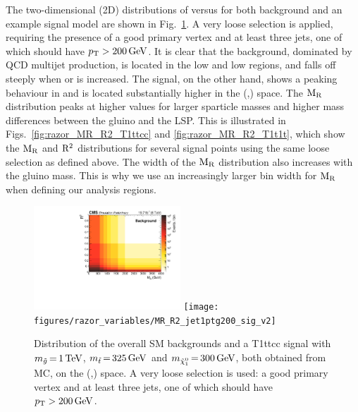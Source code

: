 The two-dimensional (2D) distributions of \rsq versus \mr for both background and an example signal
model are shown in Fig.~\ref{fig:razor_MR_Rsq_bg_signal}. A very loose selection is applied,
requiring the presence of a good primary vertex and at least three jets, one of which should have
$p_{\mathrm{T}} > 200\,\text{Ge\hspace{-.08em}V}$. It is clear that the background, dominated by QCD multijet production, is located
in the low \mr and low \rsq regions, and falls off steeply when \mr or \rsq is increased. The
signal, on the other hand, shows a peaking behaviour in \mr and is located substantially higher in
the (\mr,\rsq) space. 
The $\mathrm{M_R}$ distribution peaks at higher values for larger sparticle masses and higher mass
differences between the gluino and the LSP. This is illustrated
in Figs.~\ref{fig:razor_MR_R2_T1ttcc} and \ref{fig:razor_MR_R2_T1t1t}, which show the $\mathrm{M_R}$ and
$\mathrm{R^2}$ distributions for several signal points using the same loose selection as defined above.
The width of the $\mathrm{M_R}$ distribution also increases with the gluino mass. This is why we use an
increasingly larger bin width for $\mathrm{M_R}$ when defining our analysis regions. 


\begin{figure}[htpb]
\centering
\includegraphics[width=0.49\textwidth]{figures/razor_variables/MR_R2_jet1ptg200_bg_v2} 
\texttt{[image: figures/razor\_variables/MR\_R2\_jet1ptg200\_sig\_v2]}
\caption{Distribution of the overall SM backgrounds and a T1ttcc signal with $m_{\tilde{g}} \,{=}\,
1\,\text{Te\hspace{-.08em}V}$, $m_{\tilde{t}} \,{=}\, 325\,\text{Ge\hspace{-.08em}V}$ and $m_{\tilde{\chi}_1^0} \,{=}\, 300\,\text{Ge\hspace{-.08em}V}$, both obtained
from MC, on the (\mr,\rsq) space. A very loose selection is used:  a good primary vertex and at
least three jets, one of which should have $p_{\mathrm{T}} > 200\,\text{Ge\hspace{-.08em}V}$. 
\label{fig:razor_MR_Rsq_bg_signal}}
\end{figure}

